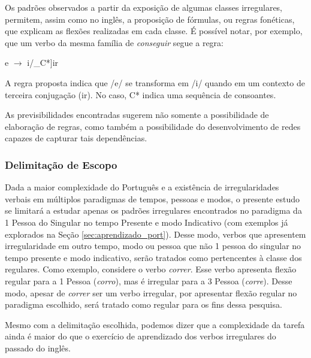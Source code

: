 Os padrões observados a partir da exposição de algumas classes irregulares, permitem, assim como no inglês, a proposição de fórmulas, ou regras fonéticas, que explicam as flexões realizadas em cada classe. É possível notar, por exemplo, que um verbo da mesma família de \textit{conseguir} segue a regra:

\begin{center}
e $\rightarrow$ i/\_C*]ir 
\end{center}

A regra proposta indica que /e/ se transforma em /i/ quando em um contexto de terceira conjugação (ir). No caso, C* indica uma sequência de consoantes. 

As previsibilidades encontradas sugerem não somente a possibilidade de elaboração de regras, como também a possibilidade do desenvolvimento de redes capazes de capturar tais dependências. 

\subsubsection{Delimitação de Escopo}
\label{sec:escopo}

Dada a maior complexidade do Português e a existência de irregularidades verbais em múltiplos paradigmas de tempos, pessoas e modos, o presente estudo se limitará a estudar apenas os padrões irregulares encontrados no paradigma da 1 Pessoa do Singular no tempo Presente e modo Indicativo (com exemplos já explorados na Seção \ref{sec:aprendizado_port}). Desse modo, verbos que apresentem irregularidade em outro tempo, modo ou pessoa que não 1 pessoa do singular no tempo presente e modo indicativo, serão tratados como pertencentes à classe dos regulares. Como exemplo, considere o verbo \textit{correr}. Esse verbo apresenta flexão regular para a 1 Pessoa (\textit{corro}), mas é irregular para a 3 Pessoa (\textit{corre}). Desse modo, apesar de \textit{correr} ser um verbo irregular, por apresentar flexão regular no paradigma escolhido, será tratado como regular para os fins dessa pesquisa.

Mesmo com a delimitação escolhida, podemos dizer que a complexidade da tarefa ainda é maior do que o exercício de aprendizado dos verbos irregulares do passado do inglês. 

 



